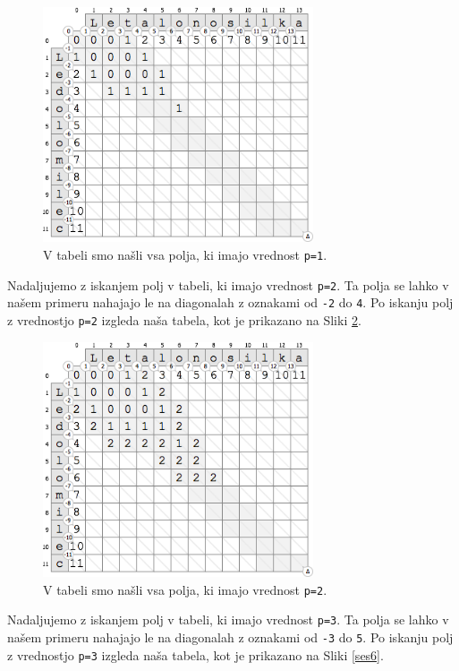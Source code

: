 \documentclass[a4paper, 12pt, twoside]{book}
\begin{document}
\begin{figure}[placement h]
\begin{center}
\includegraphics[width=8cm]{ses4.png}
\end{center}
\caption{V tabeli smo našli vsa polja, ki imajo vrednost {\tt p=1}.}
\label{ses4}
\end{figure}

Nadaljujemo z iskanjem polj v tabeli, ki imajo vrednost {\tt p=2}. Ta polja se lahko v našem primeru nahajajo le na diagonalah z oznakami od {\tt -2} do {\tt 4}. Po iskanju polj z vrednostjo {\tt p=2} izgleda naša tabela, kot je prikazano na Sliki \ref{ses5}.

\begin{figure}[placement h]
\begin{center}
\includegraphics[width=8cm]{ses5.png}
\end{center}
\caption{V tabeli smo našli vsa polja, ki imajo vrednost {\tt p=2}.}
\label{ses5}
\end{figure}

\pagebreak

Nadaljujemo z iskanjem polj v tabeli, ki imajo vrednost {\tt p=3}. Ta polja se lahko v našem primeru nahajajo le na diagonalah z oznakami od {\tt -3} do {\tt 5}. Po iskanju polj z vrednostjo {\tt p=3} izgleda naša tabela, kot je prikazano na Sliki \ref{ses6}.
\end{document}
